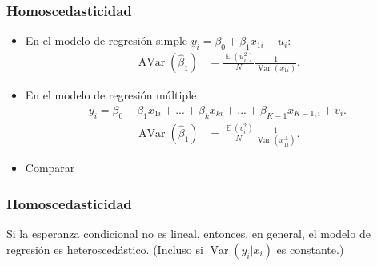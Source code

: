 \documentclass[t, compress, spanish, aspectratio=169]{beamer}
\DeclareMathOperator{\Var}{Var}
\DeclareMathOperator{\Avar}{AVar}
\DeclareMathOperator{\E}{\mathbb{E}}
\begin{document}
%
%	
	\begin{frame}
		\frametitle{Homoscedasticidad}
		\begin{itemize}
			\item En el modelo de regresi\'on simple $y_i=\beta_0+\beta_1x_{1i}+u_i$:
			\begin{align*}
				\Avar(\hat \beta_1)&=\frac{\E(u_i^2)}{N}\frac{1}{\Var(x_{1i})}.
			\end{align*}
			\item En el modelo de regresi\'on m\'ultiple
			\begin{align*}
				y_i = \beta_0+\beta_1x_{1i}+...+\beta_k x_{ki} +...+\beta_{K-1} x_{K-1,i}+ v_i.
			\end{align*}
			\begin{align*}
				\Avar(\hat \beta_1)&=\frac{\E(v_i^2)}{N}\frac{1}{\Var(x_{1i}^{\perp})}.
			\end{align*}					
			\item \alert{Comparar}
		\end{itemize}
	\end{frame}
	
	\begin{frame}
		\frametitle{Homoscedasticidad}
		Si la esperanza condicional no es lineal, entonces, en general, el modelo de regresi\'on es heterosced\'astico. (Incluso si  $\Var(y_i|x_i)$ es constante.)
	\end{frame}

%
\end{document}
